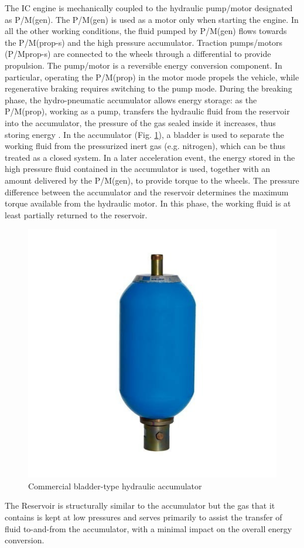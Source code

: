 \documentclass[11pt]{article}
\begin{document}
The IC engine is mechanically coupled to the hydraulic pump/motor designated as P/M(gen). The P/M(gen) is used as a motor only when starting the engine. In all the other working conditions, the fluid pumped by P/M(gen) flows towards the P/M(prop-s) and the high pressure accumulator. Traction pumps/motors (P/Mprop-s) are connected to the wheels through a differential to provide propulsion. The pump/motor is a reversible energy conversion component. In particular, operating the P/M(prop) in the motor mode propels the vehicle, while regenerative braking requires switching to the pump mode. During the breaking phase, the hydro-pneumatic accumulator allows energy storage: as the P/M(prop), working as a pump, transfers the hydraulic fluid from the reservoir into the accumulator, the pressure of the gas sealed inside it increases, thus storing energy \cite{e}. In the accumulator (Fig. \ref{hydraulic_accumulator}), a bladder is used to separate the working fluid from the pressurized inert gas (e.g. nitrogen), which can be thus treated as a closed system. In a later acceleration event, the energy stored in the high pressure fluid contained in the accumulator is used, together with an amount delivered by the P/M(gen), to provide torque to the wheels. The pressure difference between the accumulator and the reservoir determines the maximum torque available from the hydraulic motor. In this phase, the working fluid is at least partially returned to the reservoir. 

\begin{figure}[H]
\centering
\includegraphics[width=.4\textwidth]{Images/State_of_the_art/Hydraulic Accumulator.jpg}
\caption{Commercial bladder-type hydraulic accumulator}
\label{hydraulic_accumulator}
\end{figure}

The Reservoir is structurally similar to the accumulator but the gas that it contains is kept at low pressures and serves primarily to assist the transfer of fluid to-and-from the accumulator, with a minimal impact on the overall energy conversion. 
\end{document}
